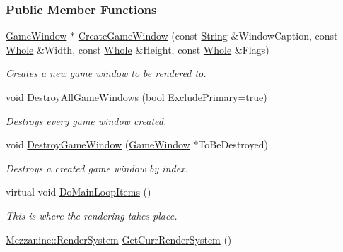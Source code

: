 \subsubsection*{Public Member Functions}
\begin{DoxyCompactItemize}
\item 
\hyperlink{classMezzanine_1_1GameWindow}{GameWindow} $\ast$ \hyperlink{classMezzanine_1_1GraphicsManager_a6d5efb7e23d2274bc5d49dd37763e645}{CreateGameWindow} (const \hyperlink{namespaceMezzanine_acf9fcc130e6ebf08e3d8491aebcf1c86}{String} \&WindowCaption, const \hyperlink{namespaceMezzanine_adcbb6ce6d1eb4379d109e51171e2e493}{Whole} \&Width, const \hyperlink{namespaceMezzanine_adcbb6ce6d1eb4379d109e51171e2e493}{Whole} \&Height, const \hyperlink{namespaceMezzanine_adcbb6ce6d1eb4379d109e51171e2e493}{Whole} \&Flags)
\begin{DoxyCompactList}\small\item\em Creates a new game window to be rendered to. \item\end{DoxyCompactList}\item 
void \hyperlink{classMezzanine_1_1GraphicsManager_a9ff5f5d4ed74f97e61fe3e6f170fa0c9}{DestroyAllGameWindows} (bool ExcludePrimary=true)
\begin{DoxyCompactList}\small\item\em Destroys every game window created. \item\end{DoxyCompactList}\item 
void \hyperlink{classMezzanine_1_1GraphicsManager_a0f03feff9d284100bdf7715ec504474c}{DestroyGameWindow} (\hyperlink{classMezzanine_1_1GameWindow}{GameWindow} $\ast$ToBeDestroyed)
\begin{DoxyCompactList}\small\item\em Destroys a created game window by index. \item\end{DoxyCompactList}\item 
virtual void \hyperlink{classMezzanine_1_1GraphicsManager_ae940c81cd1401fda34abc6fd53ede45a}{DoMainLoopItems} ()
\begin{DoxyCompactList}\small\item\em This is where the rendering takes place. \item\end{DoxyCompactList}\item 
\hyperlink{namespaceMezzanine_a1bb0347c37954bc71c4344e4b55c729a}{Mezzanine::RenderSystem} \hyperlink{classMezzanine_1_1GraphicsManager_a9592364a2ecc1b24a2ce50ce88095ffd}{GetCurrRenderSystem} ()

\end{DoxyCompactItemize}
